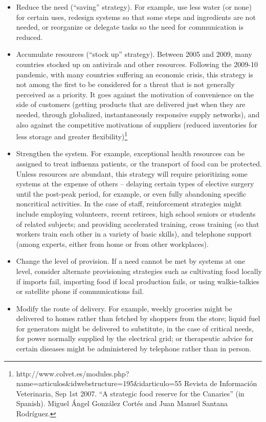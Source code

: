 \documentclass[12pt, a4]{scrartcl}
\begin{document}
\begin{itemize}
	\item Reduce the need (“saving” strategy). For example, use less water (or none) for certain uses, redesign systems so that some steps and ingredients are not needed, or reorganize or delegate tasks so the need for communication is reduced.
	\item Accumulate resources (“stock up” strategy). Between 2005 and 2009, many countries stocked up on antivirals and other resources. Following the 2009-10 pandemic, with many countries suffering an economic crisis, this strategy is not among the first to be considered for a threat that is not generally perceived as a priority. It goes against the motivation of convenience on the side of customers (getting products that are delivered just when they are needed, through globalized, instantaneously responsive supply networks), and also against the competitive motivations of suppliers (reduced inventories for less storage and greater flexibility)\footnote{http://www.colvet.es/modules.php?name=articulos&idwebstructure=195&idarticulo=55 Revista de Información Veterinaria, Sep 1st 2007. “A strategic food reserve for the Canaries” (in Spanish). Miguel Ángel González Cortés and Juan Manuel Santana Rodríguez.}
	\item Strengthen the system. For example, exceptional health resources can be assigned to treat influenza patients, or the transport of food can be protected. Unless resources are abundant, this strategy will require prioritizing some systems at the expense of others – delaying certain types of elective surgery until the post-peak period, for example, or even fully abandoning specific noncritical activities. In the case of staff, reinforcement strategies might include employing volunteers, recent retirees, high school seniors or students of related subjects; and providing accelerated training, cross training (so that workers train each other in a variety of basic skills), and telephone support (among experts, either from home or from other workplaces).
	\item Change the level of provision. If a need cannot be met by systems at one level, consider alternate provisioning strategies such as cultivating food locally if imports fail, importing food if local production fails, or using walkie-talkies or satellite phone if communications fail.
	\item Modify the route of delivery. For example, weekly groceries might be delivered to homes rather than fetched by shoppers from the store; liquid fuel for generators might be delivered to substitute, in the case of critical needs, for power normally supplied by the electrical grid; or therapeutic advice for certain diseases might be administered by telephone rather than in person.
\end{itemize}
\end{document}
